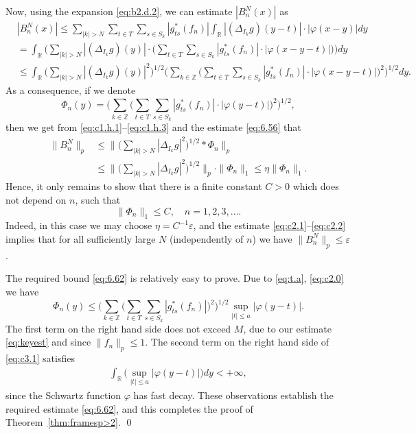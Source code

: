 \documentclass[reqno,a4paper,12pt]{amsart}
\numberwithin{equation}{section}
\numberwithin{figure}{section}
\newcommand\R{\mathbb{R}}
\newcommand\Z{\mathbb{Z}}
\newcommand\Del{\Delta}
\newcommand\1{\mathds{1}}
\newcommand\eps{\varepsilon}
\newcommand{\pphi}{\varphi}
\newcommand{\TTT}{T}
\newcommand{\SSS}{S}
\renewcommand\le{\leqslant}
\theoremstyle{plain}
\newcommand{\thmref}[1]{Theorem~\ref{#1}}
\theoremstyle{definition}
\begin{document}
Now, using the expansion \eqref{eq:b2.d.2}, we can estimate $|B^N_n(x)|$ as 
\begin{align}
&|B^N_n (x) | \le  \sum_{|k| > N} \sum_{t\in \TTT} \sum_{s\in \SSS_k}
|g_{ts}^*(f_n)|  \int_\R  | (\Del_{I_k} g ) (y-t) | \cdot | \pphi(x-y) | dy \label{eq:c1.h.1} \\
& =  \int_\R \Big( \sum_{|k| > N}  | (\Del_{I_k} g ) (y) |  \cdot 
\Big(\sum_{t\in\TTT} \sum_{s\in\SSS_k} 
|g_{ts}^*(f_n)|\cdot |\pphi(x-y-t)|\Big) \Big) dy \label{eq:c1.h.2}  \\
&\le \int_\R \Big( \sum_{|k|>N}  | (\Del_{I_k} g ) (y) |^2 \Big)^{1/2}
 \Big( \sum_{k \in \Z} \Big( \sum_{t\in\TTT} \sum_{s\in\SSS_k}
 |g_{ts}^*(f_n)|\cdot |\pphi(x-y-t)| \Big)^2 \Big)^{1/2} dy. \label{eq:c1.h.3}
\end{align}
As a consequence, if we denote
\begin{equation}
\label{eq:c2.0}
\Phi_{n}(y) =  \Big( \sum_{k\in\Z} 
\Big( \sum_{t\in\TTT} \sum_{s\in\SSS_k} 
|g_{ts}^*(f_n)|\cdot |\pphi(y-t)| \Big)^2 \Big)^{1/2},
\end{equation}
then we get from \eqref{eq:c1.h.1}--\eqref{eq:c1.h.3} 
and the estimate \eqref{eq:6.56} that
\begin{align}
\| B^N_n \|_p & \le \Big\| \Big(\sum_{|k| > N} |  \Del_{I_k}  g |^2\Big)^{1/2} 
\ast \Phi_{n} \Big\|_p \label{eq:c2.1} \\
& \le \Big\| \Big(\sum_{|k|>N} | \Del_{I_k} g|^2\Big)^{1/2}
 \Big\|_p \cdot \| \Phi_{n} \|_1 \le \eta \| \Phi_{n} \|_1. \label{eq:c2.2} 
\end{align}
Hence, it  only remains to show that there is a finite constant $C > 0$
which does not depend on $n$, such that 
\begin{equation}\label{eq:6.62}
 \| \Phi_{n} \|_{1}  \le C, \quad n=1,2,3,\dots.
\end{equation}
Indeed, in this case we may choose $\eta=C^{-1} \eps$, 
and the estimate \eqref{eq:c2.1}--\eqref{eq:c2.2} 
 implies that for all sufficiently large $N$ 
 (independently of  $n$) we have 
 $\|B^N_n\|_p \le \eps$.

The required bound \eqref{eq:6.62} is relatively easy to prove.
Due to \eqref{eq:t.a}, \eqref{eq:c2.0}  we have
\begin{equation}
\label{eq:c3.1}
\Phi_{n}(y) \le \Big( \sum_{k\in\Z} \Big( \sum_{t\in\TTT} \sum_{s\in\SSS_k} 
|g_{ts}^*(f_n)| \Big)^2 \Big)^{1/2}  \sup_{|t| \le a} |\pphi(y-t)|.
\end{equation}
The first term on the right hand side 
does not exceed $M$,
due to our estimate \eqref{eq:keyest} and since
$\|f_n\|_p\le 1$. The second term on the right hand side
of \eqref{eq:c3.1} satisfies
\begin{align}
 \int_{\R}  \Big( \sup_{|t| \le a} |\pphi(y-t)| \Big) dy < + \infty,
\end{align}
since the Schwartz function $\pphi$ has fast decay. 
These observations establish the required estimate \eqref{eq:6.62}, 
and this completes the proof of \thmref{thm:framesp>2}.
\qed
\end{document}
